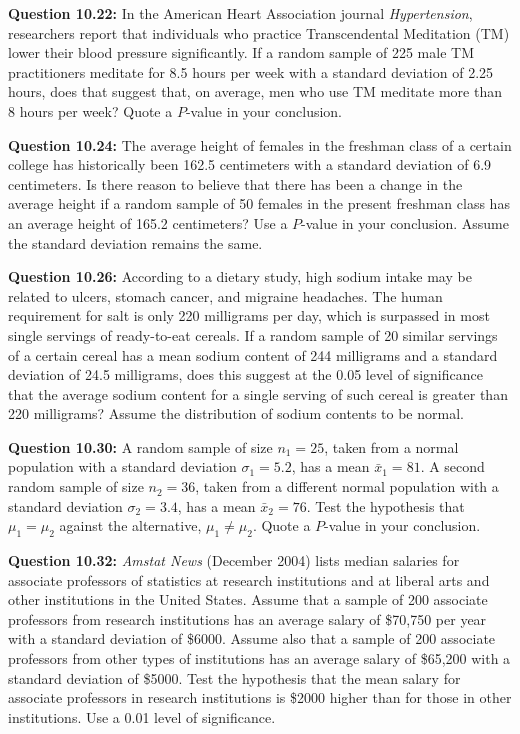 \documentclass{article}
\begin{document}
\textbf{Question 10.22:}
In the American Heart Association journal 
\textit{Hypertension}, researchers report that individuals who
practice Transcendental Meditation (TM) lower their
blood pressure significantly. If a random sample of 225
male TM practitioners meditate for 8.5 hours per week
with a standard deviation of 2.25 hours, does that suggest 
that, on average, men who use TM meditate more
than 8 hours per week? Quote a $P$-value in your 
conclusion.
\newline

\textbf{Question 10.24:}
The average height of females in the freshman
class of a certain college has historically been 162.5 
centimeters with a standard deviation of 6.9 centimeters.
Is there reason to believe that there has been a change
in the average height if a random sample of 50 females
in the present freshman class has an average height of
165.2 centimeters? Use a $P$-value in your conclusion.
Assume the standard deviation remains the same.
\newline

\textbf{Question 10.26:}
According to a dietary study, high sodium intake 
may be related to ulcers, stomach cancer, and
migraine headaches. The human requirement for salt
is only 220 milligrams per day, which is surpassed in
most single servings of ready-to-eat cereals. If a 
random sample of 20 similar servings of a certain cereal
has a mean sodium content of 244 milligrams and a
standard deviation of 24.5 milligrams, does this 
suggest at the 0.05 level of significance that the average
sodium content for a single serving of such cereal is
greater than 220 milligrams? Assume the distribution
of sodium contents to be normal.
\newline

\textbf{Question 10.30:}
A random sample of size $n_1 = 25$, taken from a
normal population with a standard deviation $\sigma_1 = 5.2$,
has a mean $\bar{x}_1 = 81$. A second random sample of size
$n_2 = 36$, taken from a different normal population with
a standard deviation $\sigma_2 = 3.4$, has a mean $\bar{x}_2 = 76$.
Test the hypothesis that $\mu_1 = \mu_2$ against the alternative, 
$\mu_1 \not= \mu_2$. Quote a $P$-value in your conclusion.
\newline

\textbf{Question 10.32:}
\textit{Amstat News} (December 2004) lists median
salaries for associate professors of statistics at research
institutions and at liberal arts and other institutions
in the United States. Assume that a sample of 200
associate professors from research institutions has an
average salary of \$70,750 per year with a standard 
deviation of \$6000. Assume also that a sample of 200 
associate professors from other types of institutions has
an average salary of \$65,200 with a standard deviation
of \$5000. Test the hypothesis that the mean salary
for associate professors in research institutions is \$2000
higher than for those in other institutions. Use a 0.01
level of significance.
\newline
\end{document}
